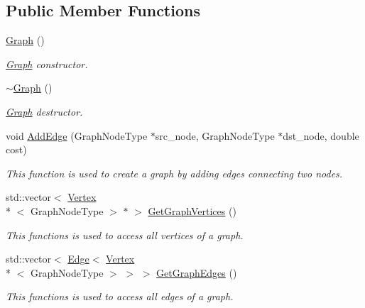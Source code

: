 \subsection*{Public Member Functions}
\begin{DoxyCompactItemize}
\item 
\hyperlink{classsrcl__ctrl_1_1Graph_a771676a45ae8f28cd8034f8063314b3f}{Graph} ()
\begin{DoxyCompactList}\small\item\em \hyperlink{classsrcl__ctrl_1_1Graph}{Graph} constructor. \end{DoxyCompactList}\item 
\hyperlink{classsrcl__ctrl_1_1Graph_a32fe1ca5b567b1cb7dd9dc47cb9a0bc9}{$\sim$\-Graph} ()
\begin{DoxyCompactList}\small\item\em \hyperlink{classsrcl__ctrl_1_1Graph}{Graph} destructor. \end{DoxyCompactList}\item 
void \hyperlink{classsrcl__ctrl_1_1Graph_a3b99f873fcce550f6b00bc720f04a647}{Add\-Edge} (Graph\-Node\-Type $\ast$src\-\_\-node, Graph\-Node\-Type $\ast$dst\-\_\-node, double cost)
\begin{DoxyCompactList}\small\item\em This function is used to create a graph by adding edges connecting two nodes. \end{DoxyCompactList}\item 
std\-::vector$<$ \hyperlink{classsrcl__ctrl_1_1Vertex}{Vertex}\\*
$<$ Graph\-Node\-Type $>$ $\ast$ $>$ \hyperlink{classsrcl__ctrl_1_1Graph_ae0497c831e1bf4c77c39b223e4da9ff2}{Get\-Graph\-Vertices} ()
\begin{DoxyCompactList}\small\item\em This functions is used to access all vertices of a graph. \end{DoxyCompactList}\item 
std\-::vector$<$ \hyperlink{classsrcl__ctrl_1_1Edge}{Edge}$<$ \hyperlink{classsrcl__ctrl_1_1Vertex}{Vertex}\\*
$<$ Graph\-Node\-Type $>$ $>$ $>$ \hyperlink{classsrcl__ctrl_1_1Graph_aefa9aee0e9904ae6745a90d22e2d5445}{Get\-Graph\-Edges} ()
\begin{DoxyCompactList}\small\item\em This functions is used to access all edges of a graph. \end{DoxyCompactList}\item 

\end{DoxyCompactItemize}
